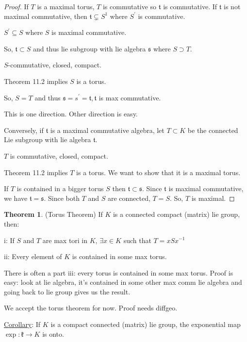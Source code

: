 \documentclass{article}
\theoremstyle{definition}
\newtheorem{theorem}{Theorem}
\begin{document}
\begin{proof}
    If \(T\) is a maximal torus, \(T\) is commutative so \(\mathfrak{t}\) is commutative. If \(\mathfrak{t}\) is not maximal commutative, then \(\mathfrak{t} \subsetneq S^1\) where \(S^{\prime}\) is commutative.
    
    \(S^{\prime} \subseteq S\) where \(S\) is maximal commutative.
    
    So, \(\mathfrak{t} \subset S\) and thus lie subgroup with lie algebra \(\mathfrak{s}\) where \(S \supset T\).
    
    \(S\)-commutative, closed, compact.

    Theorem 11.2 implies \(S\) is a torus.

    So, \(S=T\) and thus \(\mathfrak{s} = s^{\prime} = \mathfrak{t}, \mathfrak{t} \) is max commutative.
    
    This is one direction. Other direction is easy.

    Conversely, if \(\mathfrak{t}\) is a maximal commutative algebra, let \(T \subset K\) be the connected Lie subgroup with lie algebra \(\mathfrak{t}\).

    \(T\) is commutative, closed, compact.
    
    Theorem 11.2 implies \(T\) is a torus. We want to show that it is a maximal torus.

    If \(T\) is contained in a bigger torus \(S\) then \(\mathfrak{t} \subset \mathfrak{s}\). Since \(\mathfrak{t}\) is maximal commutative, we have \(\mathfrak{t} = \mathfrak{s}\). Since both \(T\) and \(S\) are connected, \(T=S\). So, \(T\) is maximal.   
\end{proof}

\begin{theorem}
    (Torus Theorem) If \(K\) is a connected compact (matrix) lie group, then:

    i: If \(S\) and \(T\) are max tori in \(K\), \(\exists x\in K\) such that \(T = xSx ^{-1}\)
    
    ii: Every element of \(K\) is contained in some max torus.
\end{theorem}

There is often a part iii: every torus is contained in some max torus. Proof is easy: look at lie algebra, it's contained in some other max comm lie algebra and going back to lie group gives us the result.

We accept the torus theorem for now. Proof needs diffgeo.

\underline{Corollary}: If \(K\) is a compact connected (matrix) lie group, the exponential map \(\exp: \mathfrak{k} \to K\) is onto.
\end{document}
